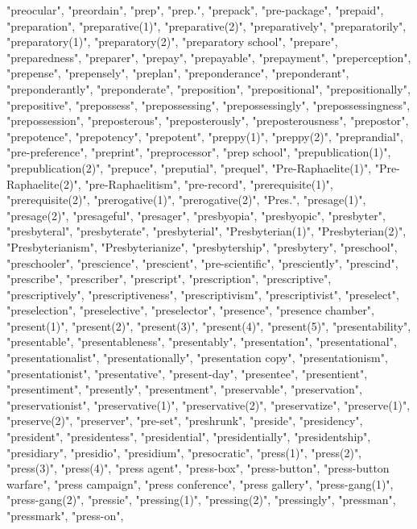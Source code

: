 "preocular",
"preordain",
"prep",
"prep.",
"prepack",
"pre-package",
"prepaid",
"preparation",
"preparative(1)",
"preparative(2)",
"preparatively",
"preparatorily",
"preparatory(1)",
"preparatory(2)",
"preparatory school",
"prepare",
"preparedness",
"preparer",
"prepay",
"prepayable",
"prepayment",
"preperception",
"prepense",
"prepensely",
"preplan",
"preponderance",
"preponderant",
"preponderantly",
"preponderate",
"preposition",
"prepositional",
"prepositionally",
"prepositive",
"prepossess",
"prepossessing",
"prepossessingly",
"prepossessingness",
"prepossession",
"preposterous",
"preposterously",
"preposterousness",
"prepostor",
"prepotence",
"prepotency",
"prepotent",
"preppy(1)",
"preppy(2)",
"preprandial",
"pre-preference",
"preprint",
"preprocessor",
"prep school",
"prepublication(1)",
"prepublication(2)",
"prepuce",
"preputial",
"prequel",
"Pre-Raphaelite(1)",
"Pre-Raphaelite(2)",
"pre-Raphaelitism",
"pre-record",
"prerequisite(1)",
"prerequisite(2)",
"prerogative(1)",
"prerogative(2)",
"Pres.",
"presage(1)",
"presage(2)",
"presageful",
"presager",
"presbyopia",
"presbyopic",
"presbyter",
"presbyteral",
"presbyterate",
"presbyterial",
"Presbyterian(1)",
"Presbyterian(2)",
"Presbyterianism",
"Presbyterianize",
"presbytership",
"presbytery",
"preschool",
"preschooler",
"prescience",
"prescient",
"pre-scientific",
"presciently",
"prescind",
"prescribe",
"prescriber",
"prescript",
"prescription",
"prescriptive",
"prescriptively",
"prescriptiveness",
"prescriptivism",
"prescriptivist",
"preselect",
"preselection",
"preselective",
"preselector",
"presence",
"presence chamber",
"present(1)",
"present(2)",
"present(3)",
"present(4)",
"present(5)",
"presentability",
"presentable",
"presentableness",
"presentably",
"presentation",
"presentational",
"presentationalist",
"presentationally",
"presentation copy",
"presentationism",
"presentationist",
"presentative",
"present-day",
"presentee",
"presentient",
"presentiment",
"presently",
"presentment",
"preservable",
"preservation",
"preservationist",
"preservative(1)",
"preservative(2)",
"preservatize",
"preserve(1)",
"preserve(2)",
"preserver",
"pre-set",
"preshrunk",
"preside",
"presidency",
"president",
"presidentess",
"presidential",
"presidentially",
"presidentship",
"presidiary",
"presidio",
"presidium",
"presocratic",
"press(1)",
"press(2)",
"press(3)",
"press(4)",
"press agent",
"press-box",
"press-button",
"press-button warfare",
"press campaign",
"press conference",
"press gallery",
"press-gang(1)",
"press-gang(2)",
"pressie",
"pressing(1)",
"pressing(2)",
"pressingly",
"pressman",
"pressmark",
"press-on",
